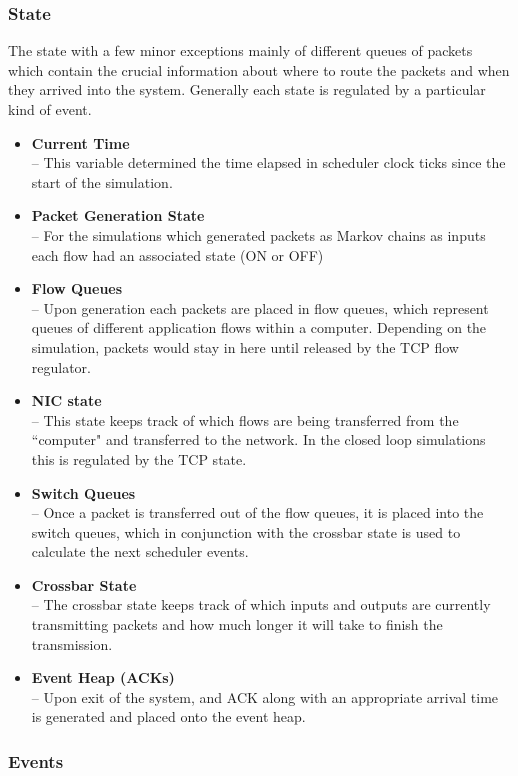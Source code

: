 \documentclass[11pt]{article}%
\begin{document}
 \subsubsection{State}
 
The state with a few minor exceptions mainly of different queues of packets which contain the crucial information about where to route the packets and when they arrived into the system.  Generally each state is regulated by a particular kind of event.
\begin{itemize}
\item {\bf Current Time}\\
 --  This variable determined the time elapsed in scheduler clock ticks since the start of the simulation.
\item {\bf Packet Generation State}\\
 --  For the simulations which generated packets as Markov chains as inputs each flow had an associated state (ON or OFF)
\item {\bf Flow Queues}\\
 --  Upon generation each packets are placed in flow queues, which represent queues of different application flows within a computer.  Depending on the simulation, packets would stay in here until released by the TCP flow regulator.
\item {\bf NIC state}\\
 --  This state keeps track of which flows are being transferred from the ``computer" and transferred to the network.  In the closed loop simulations this is regulated by the TCP state.
\item {\bf Switch Queues}\\
--  Once a packet is transferred out of the flow queues, it is placed into the switch queues, which in conjunction with the crossbar state is used to calculate the next scheduler events.
\item {\bf Crossbar State}\\
--  The crossbar state keeps track of which inputs and outputs are currently transmitting packets and how much longer it will take to finish the transmission.
\item {\bf Event Heap (ACKs)}\\
--  Upon exit of the system, and ACK along with an appropriate arrival time is generated and placed onto the event heap.  
\end{itemize}

\subsubsection{Events}
\end{document}
